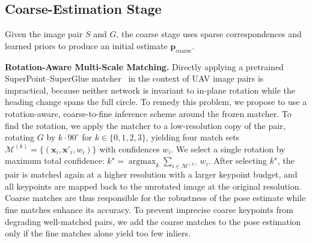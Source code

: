 
\subsection{Coarse-Estimation Stage}\label{Coarse-estimation}
Given the image pair $S$ and $G$, the coarse stage uses sparse correspondences and learned priors to produce an initial estimate $\mathbf{p}_{\text{coarse}}$.

\noindent\textbf{Rotation-Aware Multi-Scale Matching.}
Directly applying a pretrained SuperPoint--SuperGlue matcher~\citep{detone2018superpoint,sarlin2020superglue} in the context of UAV image pairs is impractical, because neither network is invariant to in-plane rotation while the heading change spans the full circle. To remedy this problem, we propose to use a rotation-aware, coarse-to-fine inference scheme around the frozen matcher. To find the rotation, we apply the matcher to a low-resolution copy of the pair, rotating $G$ by $k\cdot90^\circ$ for $k\in\{0,1,2,3\}$, yielding four match sets $\mathcal{M}^{(k)}=\{(\mathbf{x}_i,\mathbf{x}'_i,w_i)\}$ with confidences $w_i$. We select a single rotation by maximum total confidence: $k^\star=\operatorname*{argmax}_{k}\sum_{i\in\mathcal{M}^{(k)}}w_i$. After selecting $k^\star$, the pair is matched again at a higher resolution with a larger keypoint budget, and all keypoints are mapped back to the unrotated image at the original resolution. Coarse matches are thus responsible for the robustness of the pose estimate while fine matches enhance its accuracy. To prevent imprecise coarse keypoints from degrading well-matched pairs, we add the coarse matches to the pose estimation only if the fine matches alone yield too few inliers.

